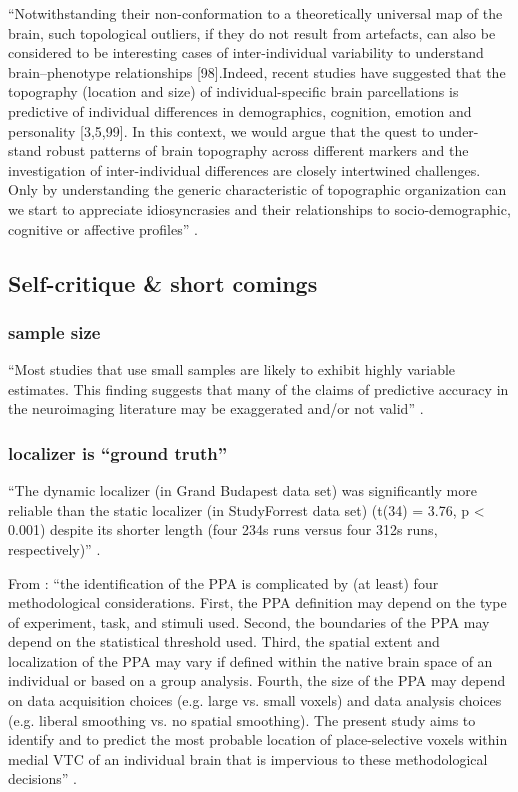 ``Notwithstanding their non-conformation to a theoretically universal map of the
brain, such topological outliers, if they do not result from artefacts, can also
be considered to be interesting cases of inter-individual variability to
understand brain–phenotype relationships [98].Indeed, recent studies have
suggested that the topography (location and size) of individual-specific brain
parcellations is predictive of individual differences in demographics,
cognition, emotion and personality [3,5,99]. In this context, we would argue
that the quest to under- stand robust patterns of brain topography across
different markers and the investigation of inter-individual differences are
closely intertwined challenges. Only by understanding the generic characteristic
of topographic organization can we start to appreciate idiosyncrasies and their
relationships to socio-demographic, cognitive or affective profiles''
\citep{eickhoff2018imaging}.

\subsection{Self-critique \& short comings}


\subsubsection{sample size}

``Most studies that use small samples are likely to exhibit highly variable
estimates. This finding suggests that many of the claims of predictive accuracy
in the neuroimaging literature may be exaggerated and/or not valid''
\citep{poldrack2019establishment}.


\subsubsection{localizer is ``ground truth''}

%
``The dynamic localizer (in Grand Budapest data set) was significantly more
reliable than the static localizer (in StudyForrest data set) (t(34) = 3.76, p <
0.001) despite its shorter length (four 234s runs versus four 312s runs,
respectively)'' \citep{jiahui2020predicting}.

%
From \citep{weiner2018defining}: ``the identification of the PPA is complicated
by (at least) four methodological considerations. First, the PPA definition may
depend on the type of experiment, task, and stimuli used. Second, the boundaries
of the PPA may depend on the statistical threshold used. Third, the spatial
extent and localization of the PPA may vary if defined within the native brain
space of an individual or based on a group analysis. Fourth, the size of the PPA
may depend on data acquisition choices (e.g. large vs. small voxels) and data
analysis choices (e.g. liberal smoothing vs. no spatial smoothing). The present
study aims to identify and to predict the most probable location of
place-selective voxels within medial VTC of an individual brain that is
impervious to these methodological decisions'' \citep{weiner2018defining}.

